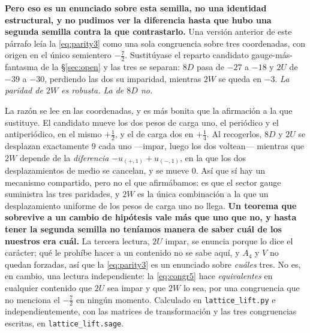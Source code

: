 \documentclass[11pt,a4paper]{article}
\begin{document}
\noindent \textbf{Pero eso es un enunciado sobre esta semilla, no una identidad estructural, y no
pudimos ver la diferencia hasta que hubo una segunda semilla contra la que contrastarlo.} Una
versión anterior de este párrafo leía la \eqref{eq:parity3} como una sola congruencia sobre tres
coordenadas, con origen en el único semientero $-\tfrac72$. Sustitúyase el reparto candidato
gauge-más-fantasma de la \S\ref{sec:open} y las tres se separan: $8D$ pasa de $-27$ a $-18$ y $2U$
de $-39$ a $-30$, perdiendo las dos su imparidad, mientras $2W$ se queda en $-3$. \emph{La paridad
de $2W$ es robusta. La de $8D$ no.}

\noindent La razón se lee en las coordenadas, y es más bonita que la afirmación a la que sustituye.
El candidato mueve los dos pesos de carga uno, el periódico y el antiperiódico, en el mismo
$+\tfrac12$, y el de carga dos en $+\tfrac14$. Al recogerlos, $8D$ y $2U$ se desplazan exactamente
$9$ cada uno ---impar, luego los dos voltean--- mientras que $2W$ depende de la \emph{diferencia}
$-u_{(+,1)}+u_{(-,1)}$, en la que los dos desplazamientos de medio se cancelan, y se mueve $0$. Así
que sí hay un mecanismo compartido, pero no el que afirmábamos: es que el sector gauge suministra
las tres paridades, y $2W$ es la única combinación a la que un desplazamiento uniforme de los pesos
de carga uno no llega. \textbf{Un teorema que sobrevive a un cambio de hipótesis vale más que uno
que no, y hasta tener la segunda semilla no teníamos manera de saber cuál de los nuestros era
cuál.} La
tercera lectura, $2U$ impar, se enuncia porque lo dice el carácter; qué le prohíbe hacer a un
contenido no se sabe aquí, y $A_4$ y $V$ no quedan forzadas, así que la \eqref{eq:parity3} es un
enunciado sobre \emph{cuáles} tres. No es, en cambio, una lectura independiente: la
\eqref{eq:congr5} hace \emph{equivalentes} en cualquier contenido que $2U$ sea impar y que $2W$ lo
sea, por una congruencia que no menciona el $-\tfrac72$ en ningún momento.
Calculado en \texttt{lattice\_\allowbreak lift.py} e
independientemente, con las matrices de transformación y las tres congruencias escritas, en
\texttt{lattice\_\allowbreak lift.sage}.
\end{document}
